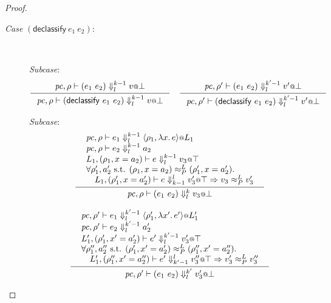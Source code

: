 \documentclass{article}
\makeatletter
\theoremstyle{definition}
\newcommand{\at}{\ensuremath{{\scriptstyle{@}}}}
\newcommand{\pc}{\ensuremath{{\mathit{pc}}}}
\makeatother
\begin{document}
\begin{proof}
\begin{description}
  \item[\emph{Case} $(\mathsf{declassify}\ e_1\ e_2)$:]\
    
    \emph{Subcase}:
    \begin{gather*}
      \inference{
        \pc, \rho |- (e_1\ e_2) \Downarrow^{k-1}_{l} v \at \bot
      }{
        \pc, \rho |- (\mathsf{declassify}\ e_1\ e_2) \Downarrow^{k-1}_{l}
        v \at \bot
      }
      \quad
      \inference{
        \pc, \rho' |- (e_1\ e_2) \Downarrow^{k'-1}_{l} v' \at \bot
      }{
        \pc, \rho' |- (\mathsf{declassify}\ e_1\ e_2) \Downarrow^{k'-1}_{l}
        v' \at \bot
      }
    \end{gather*}

    \emph{Subcase}:
    \begin{gather*}
      \inference{
        {\begin{array}{l}
            \pc, \rho |- e_1 \Downarrow^{k-1}_{l}
            \langle{\rho_1, \lambda{x}.\, e\rangle} \at L_1
            \\
            \pc, \rho |- e_2 \Downarrow^{k-1}_{l} a_2
            \\
            L_1, (\rho_1, x = a_2) |- e \Downarrow^{k-1}_{l} v_3 \at \top
            \\
            \forall{\rho_1', a_2' \text{ s.t. }
              (\rho_1, x = a_2) \approx^{L}_{P} (\rho_1', x = a_2')}.
            \\\quad
            L_1, (\rho_1', x = a_2') |- e \Downarrow^{l}_{k-1} v_3' \at \top =>
            v_3 \approx^{L}_{P} v_3'
          \end{array}}
      }{
        \pc, \rho |- (e_1\ e_2) \Downarrow^{k}_{l} v_3 \at \bot
      }
      \\[2ex]
      \inference{
        {\begin{array}{l}
            \pc, \rho' |- e_1 \Downarrow^{k'-1}_{l}
            \langle{\rho_1', \lambda{x'}.\, e'\rangle} \at L_1'
            \\
            \pc, \rho' |- e_2 \Downarrow^{k'-1}_{l} a_2'
            \\
            L_1', (\rho_1', x' = a_2') |- e' \Downarrow^{k'-1}_{l} v_3' \at \top
            \\
            \forall{\rho_1'', a_2'' \text{ s.t. }
              (\rho_1', x' = a_2') \approx^{L}_{P} (\rho_1'', x' = a_2'')}.
            \\\quad
            L_1', (\rho_1'', x' = a_2'') |- e' \Downarrow^{l}_{k'-1}
            v_3'' \at \top =>
            v_3' \approx^{L}_{P} v_3''
          \end{array}}
      }{
        \pc, \rho' |- (e_1\ e_2) \Downarrow^{k'}_{l} v_3' \at \bot
      }
    \end{gather*}
    
  \end{description}
\end{proof}
\end{document}
